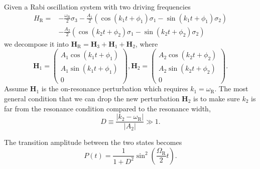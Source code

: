 \documentclass[%
reprint,
 amsmath,amssymb,
 prd,
]{revtex4-1}
\newcommand{\RD}{D}
\begin{document}
Given a Rabi oscillation system with two driving frequencies
\begin{align*}
    H_{\mathrm R} =& -\frac{\omega_{\mathrm R}}{2}\sigma_3 - \frac{A_{1} }{2}  \left( \cos(k_{1} t +\phi_{1})\sigma_1  - \sin(k_{1} t +\phi_{1}) \sigma_2\right) \nonumber\\
    & - \frac{A_{2} }{2}  \left( \cos(k_{2} t +\phi_{2})\sigma_1  - \sin(k_{2} t +\phi_{2}) \sigma_2\right)
\end{align*}
we decompose it into $\mathbf{H}_{\mathrm R}=\mathbf{H}_3 + \mathbf{H}_{1} + \mathbf{H}_2$, where
\begin{equation*}
    \mathbf{H}_1 =  \begin{pmatrix}
     A_{1} \cos(k_{1}t+\phi_{1}) \\
     A_{1} \sin(k_{1}t+\phi_{1})  \\
     0
      \end{pmatrix},   \mathbf{H}_2 =  \begin{pmatrix}
     A_{2} \cos(k_{2}t+\phi_{2}) \\
     A_{2} \sin(k_{2}t+\phi_{2})  \\
     0
      \end{pmatrix}.
\end{equation*}
Assume $\mathbf{H}_1$ is the on-resonance perturbation which requires $k_1 = \omega_{\mathrm{R}}$. The most general condition that we can drop the new perturbation $\mathbf{H}_2$ is to make sure $k_2$ is far from the resonance condition compared to the resonance width,
\begin{equation}
\RD \equiv \frac{\lvert k_2 -\omega_{\mathrm R}\rvert}{\lvert A_2\rvert} \gg 1.
\end{equation}

The transition amplitude between the two states becomes
\begin{equation}
P(t) = \frac{1}{1+\RD^2}\sin^2(\frac{\Omega_{\mathrm{R}}}{2}t).
\end{equation}





 



\end{document}
